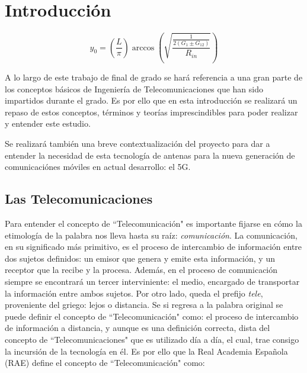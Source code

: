 
\chapter{Introducción}
\label{cap1}

\begin{equation}
	y_{0}=\left ( \frac{L}{\pi} \right )\arccos\left ( \sqrt{\frac{\frac{1}{2(G_{1}\pm G_{12})}}{R_{in}}} \right )
	\label{eq:yo}
\end{equation}
\par A lo largo de este trabajo de final de grado se hará referencia a una gran parte de los conceptos básicos de Ingeniería de Telecomunicaciones que han sido impartidos durante el grado. Es por ello que en esta introducción se realizará un repaso de estos conceptos, términos y teorías imprescindibles para poder realizar y entender este estudio.
\\
\par Se realizará también una breve contextualización del proyecto para dar a entender la necesidad de esta tecnología de antenas para la nueva generación de comunicaciónes móviles en actual desarrollo: el 5G. 

\section{Las Telecomunicaciones}

\par Para entender el concepto de ``Telecomunicación" es importante fijarse en cómo la etimología de la palabra nos lleva hasta su raíz: \textit{comunicación}. La comunicación, en su significado más primitivo, es el proceso de intercambio de información entre dos sujetos definidos: un emisor que genera y emite esta información, y un receptor que la recibe y la procesa. Además, en el proceso de comunicación siempre se encontrará un tercer interviniente: el medio, encargado de transportar la información entre ambos sujetos. Por otro lado, queda el prefijo \textit{tele}, proveniente del griego: lejos o distancia. Se si regresa a la palabra original se puede definir el concepto de ``Telecomunicación" como: el proceso de intercambio de información a distancia, y aunque es una definición correcta, dista del concepto de ``Telecomunicaciones" que es utilizado día a día, el cual, trae consigo la incursión de la tecnología en él. Es por ello que la Real Academia Española (RAE) define el concepto de ``Telecomunicación" como: \cite{telecomunicacion2019}


